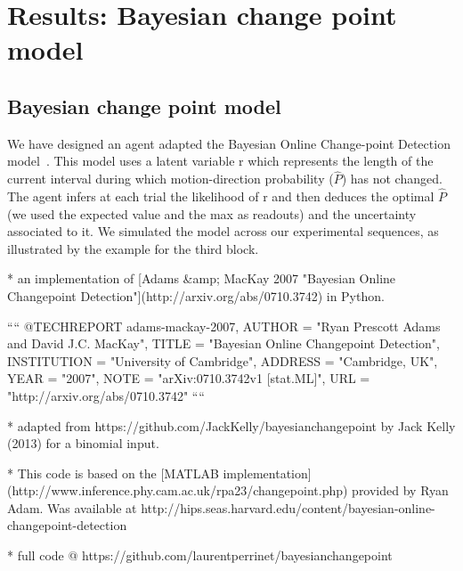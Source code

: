 \documentclass[profile,final,english, draft]{article}%
\begin{document}
\section{Results: Bayesian change point model}



\subsection{Bayesian change point model}

We have designed an agent adapted the Bayesian Online Change-point Detection model~\parencite{AdamsMackay2007}. This model uses a latent variable r which represents the length of the current interval during which motion-direction probability ($\hat{P}$) has not changed. The agent infers at each trial the likelihood  of r and then deduces the optimal $\hat{P}$ (we used the expected value and the max as readouts) and the uncertainty associated to it. We simulated the model across our experimental sequences, as illustrated by the example for the third block.


* an implementation of
[Adams &amp; MacKay 2007 "Bayesian Online Changepoint Detection"](http://arxiv.org/abs/0710.3742)
in Python.

````
@TECHREPORT{ adams-mackay-2007,
AUTHOR = "Ryan Prescott Adams and David J.C. MacKay",
TITLE  = "Bayesian Online Changepoint Detection",
INSTITUTION = "University of Cambridge",
ADDRESS = "Cambridge, UK",
YEAR = "2007",
NOTE = "arXiv:0710.3742v1 [stat.ML]",
URL = "http://arxiv.org/abs/0710.3742"
}
````

* adapted from https://github.com/JackKelly/bayesianchangepoint by Jack Kelly (2013) for a binomial input.

* This code is based on the  [MATLAB implementation](http://www.inference.phy.cam.ac.uk/rpa23/changepoint.php) provided by Ryan Adam. Was available at http://hips.seas.harvard.edu/content/bayesian-online-changepoint-detection

 * full code @ https://github.com/laurentperrinet/bayesianchangepoint
\end{document}
